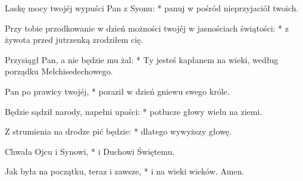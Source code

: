 ﻿\setcounter{enumi}{2}%
\item Laskę mocy twojéj wypuści Pan z Syonu: * panuj w pośród nieprzyjaciół twoich.
\item Przy tobie przodkowanie w dzień możności twojéj w jasnościach świątości: * z żywota przed jutrzenką zrodziłem cię.
\item Przysiągł Pan, a nie będzie mu żal: * Ty jesteś kapłanem na wieki, według porządku Melchisedechowego.
\item Pan po prawicy twojéj, * poraził w dzień gniewu swego króle.
\item Będzie sądził narody, napełni upaści: * potłucze głowy wielu na ziemi.
\item Z strumienia na drodze pić będzie: * dlatego wywyższy głowę.
\item Chwała Ojcu i Synowi, * i Duchowi Świętemu.
\item Jak była na początku, teraz i zawsze, * i na wieki wieków. Amen.
